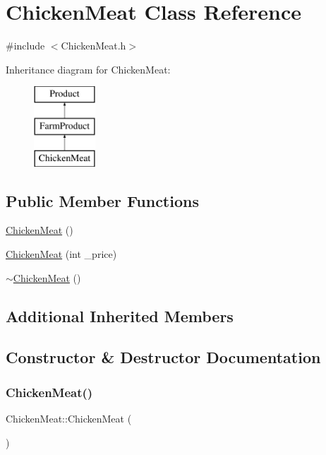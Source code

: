 \hypertarget{classChickenMeat}{}\section{Chicken\+Meat Class Reference}
\label{classChickenMeat}


{\ttfamily \#include $<$Chicken\+Meat.\+h$>$}

Inheritance diagram for Chicken\+Meat\+:\begin{figure}[H]
\begin{center}
\leavevmode
\includegraphics[height=3.000000cm]{classChickenMeat}
\end{center}
\end{figure}
\subsection*{Public Member Functions}
\begin{DoxyCompactItemize}
\item 
\mbox{\hyperlink{classChickenMeat_a8d2f871badf31c9328a3f5756723643e}{Chicken\+Meat}} ()
\item 
\mbox{\hyperlink{classChickenMeat_a93b9ad839f77e1b1dbade099d73c1607}{Chicken\+Meat}} (int \+\_\+price)
\item 
\mbox{\hyperlink{classChickenMeat_a52fb9da066eb48d5cfb45aa3bfd77129}{$\sim$\+Chicken\+Meat}} ()
\end{DoxyCompactItemize}
\subsection*{Additional Inherited Members}


\subsection{Constructor \& Destructor Documentation}
\mbox{\label{classChickenMeat_a8d2f871badf31c9328a3f5756723643e}} 
\subsubsection{\texorpdfstring{ChickenMeat()}{ChickenMeat()}\hspace{0.1cm}{\footnotesize\ttfamily [1/2]}}
{\footnotesize\ttfamily Chicken\+Meat\+::\+Chicken\+Meat (\begin{DoxyParamCaption}{ }\end{DoxyParamCaption})}

